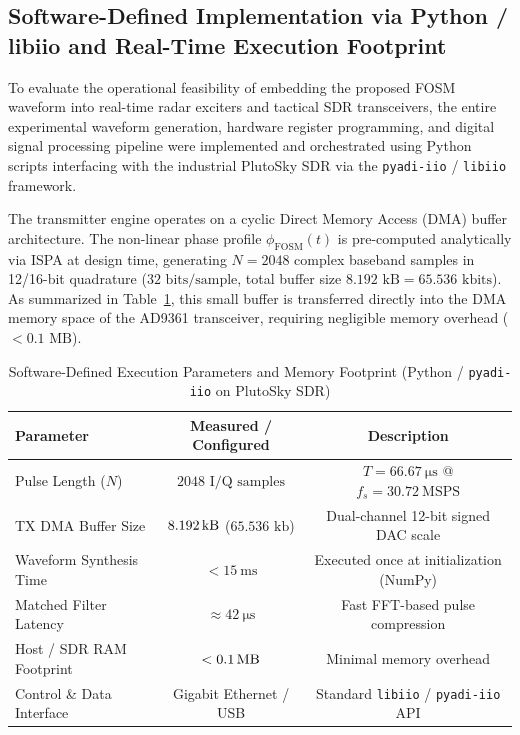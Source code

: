 \documentclass[journal,compsoc]{IEEEtran}
\begin{document}
\subsection{Software-Defined Implementation via Python / libiio and Real-Time Execution Footprint}
To evaluate the operational feasibility of embedding the proposed FOSM waveform into real-time radar exciters and tactical SDR transceivers, the entire experimental waveform generation, hardware register programming, and digital signal processing pipeline were implemented and orchestrated using Python scripts interfacing with the industrial PlutoSky SDR via the \texttt{pyadi-iio} / \texttt{libiio} framework.

The transmitter engine operates on a cyclic Direct Memory Access (DMA) buffer architecture. The non-linear phase profile $\phi_{\text{FOSM}}(t)$ is pre-computed analytically via ISPA at design time, generating $N = 2048$ complex baseband samples in 12/16-bit quadrature ($32\text{ bits/sample}$, total buffer size $8.192\text{ kB} = 65.536\text{ kbits}$). As summarized in Table~\ref{tab:sdr_software_resources}, this small buffer is transferred directly into the DMA memory space of the AD9361 transceiver, requiring negligible memory overhead ($<0.1\text{ MB}$).

\begin{table}[t]
\centering
\caption{Software-Defined Execution Parameters and Memory Footprint (Python / \texttt{pyadi-iio} on PlutoSky SDR)}
\label{tab:sdr_software_resources}
\begin{tabular}{lcc}
\toprule
\textbf{Parameter} & \textbf{Measured / Configured} & \textbf{Description} \\
\midrule
Pulse Length ($N$) & $2048\text{ I/Q samples}$ & $T = \SI{66.67}{\micro\second}$ @ $f_s = \SI{30.72}{\mega\text{SPS}}$ \\
TX DMA Buffer Size & $\SI{8.192}{\kilo\byte}$ ($65.536\text{ kb}$) & Dual-channel 12-bit signed DAC scale \\
Waveform Synthesis Time & $< \SI{15}{\milli\second}$ & Executed once at initialization (NumPy) \\
Matched Filter Latency & $\approx \SI{42}{\micro\second}$ & Fast FFT-based pulse compression \\
Host / SDR RAM Footprint & $< \SI{0.1}{\mega\byte}$ & Minimal memory overhead \\
Control \& Data Interface & Gigabit Ethernet / USB & Standard \texttt{libiio} / \texttt{pyadi-iio} API \\
\bottomrule
\end{tabular}
\end{table}
\end{document}
